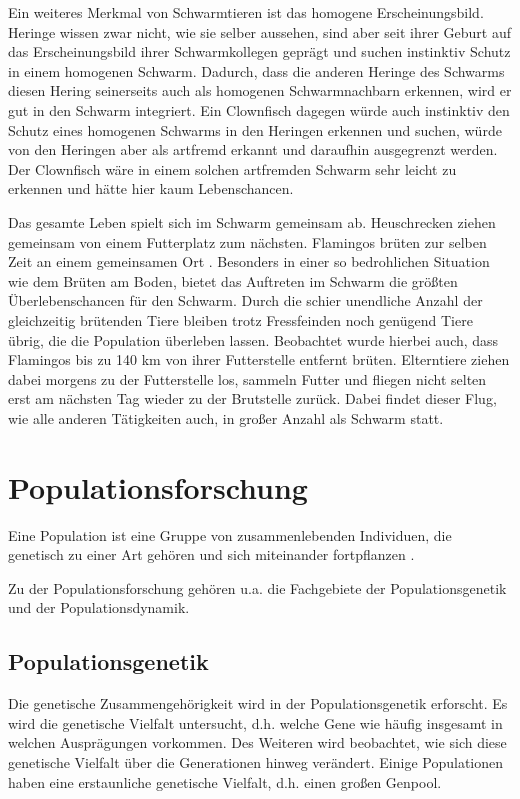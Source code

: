\documentclass[draft=false
              ,paper=a4
              ,twoside=false
              ,fontsize=11pt
              ,headsepline
              ,BCOR10mm
              ,DIV11
              ,bibtotoc
              ,liststotoc
              ]{scrbook}
\begin{document}
Ein weiteres Merkmal von Schwarmtieren ist das homogene Erscheinungsbild. Heringe wissen zwar nicht, wie sie selber aussehen, sind aber seit ihrer Geburt auf das Erscheinungsbild ihrer Schwarmkollegen geprägt und suchen instinktiv Schutz in einem homogenen Schwarm. Dadurch, dass die anderen Heringe des Schwarms diesen Hering seinerseits auch als homogenen Schwarmnachbarn erkennen, wird er gut in den Schwarm integriert. Ein Clownfisch dagegen würde auch instinktiv den Schutz eines homogenen Schwarms in den Heringen erkennen und suchen, würde von den Heringen aber als artfremd erkannt und daraufhin ausgegrenzt werden. Der Clownfisch wäre in einem solchen artfremden Schwarm sehr leicht zu erkennen und hätte hier kaum Lebenschancen.

Das gesamte Leben spielt sich im Schwarm gemeinsam ab. Heuschrecken ziehen gemeinsam von einem Futterplatz zum nächsten. Flamingos brüten zur selben Zeit an einem gemeinsamen Ort \cite{flamingo}. Besonders in einer so bedrohlichen Situation wie dem Brüten am Boden, bietet das Auftreten im Schwarm die größten Überlebenschancen für den Schwarm. Durch die schier unendliche Anzahl der gleichzeitig brütenden Tiere bleiben trotz Fressfeinden noch genügend Tiere übrig, die die Population überleben lassen. Beobachtet wurde hierbei auch, dass Flamingos bis zu 140 km von ihrer Futterstelle entfernt brüten. Elterntiere ziehen dabei morgens zu der Futterstelle los, sammeln Futter und fliegen nicht selten erst am nächsten Tag wieder zu der Brutstelle zurück\cite{flamingo}. Dabei findet dieser Flug, wie alle anderen Tätigkeiten auch, in großer Anzahl als Schwarm statt.

\section{Populationsforschung}
Eine Population ist eine Gruppe von zusammenlebenden Individuen, die genetisch zu einer Art gehören und sich miteinander fortpflanzen \cite{genetik}.

Zu der Populationsforschung gehören u.a. die Fachgebiete der Populationsgenetik und der Populationsdynamik.
\subsection{Populationsgenetik}
Die genetische Zusammengehörigkeit wird in der Populationsgenetik erforscht. Es wird die genetische Vielfalt untersucht, d.h. welche Gene wie häufig insgesamt in welchen Ausprägungen vorkommen. Des Weiteren wird beobachtet, wie sich diese genetische Vielfalt über die Generationen hinweg verändert. Einige Populationen haben eine erstaunliche genetische Vielfalt, d.h. einen großen Genpool.
\end{document}
